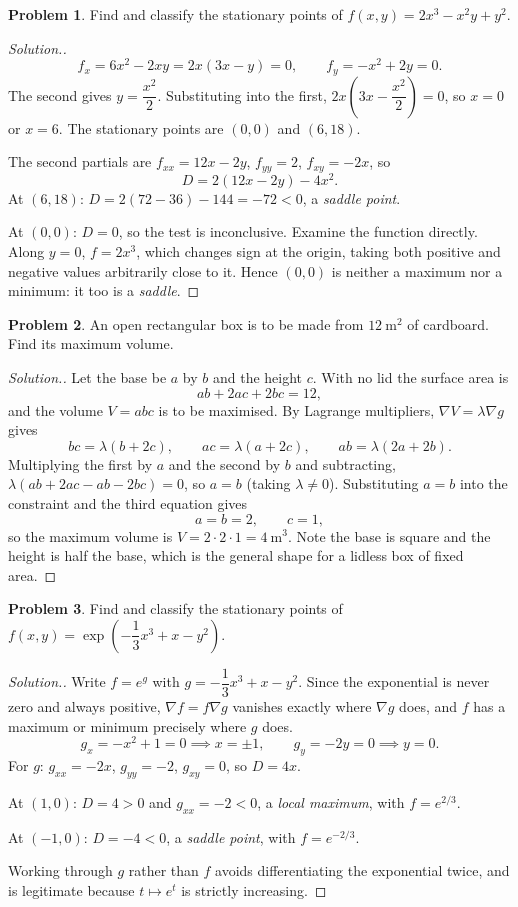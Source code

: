 \documentclass[11pt,a4paper]{article}
\theoremstyle{definition}
\newtheorem{problemx}{Problem}[subsection]
\newenvironment{problem}{\begin{problemx}}{\end{problemx}}
\newenvironment{solution}
  {\renewcommand{\qedsymbol}{}\begin{proof}[\textit{Solution}.]}
  {\end{proof}}
\begin{document}
\begin{problem}
Find and classify the stationary points of $f(x,y) = 2x^3-x^2y+y^2$.
\end{problem}
\begin{solution}
\[f_x = 6x^2-2xy = 2x(3x-y) = 0,\qquad f_y = -x^2+2y = 0 .\]
The second gives $y = \dfrac{x^2}{2}$. Substituting into the first,
$2x\left(3x-\dfrac{x^2}{2}\right) = 0$, so $x = 0$ or $x = 6$. The stationary
points are $(0,0)$ and $(6,18)$.

The second partials are $f_{xx} = 12x-2y$, $f_{yy} = 2$, $f_{xy} = -2x$, so
\[D = 2(12x-2y) - 4x^2 .\]
At $(6,18)$: $D = 2(72-36)-144 = -72 < 0$, a \emph{saddle point}.

At $(0,0)$: $D = 0$, so the test is inconclusive. Examine the function directly.
Along $y=0$, $f = 2x^3$, which changes sign at the origin, taking both positive
and negative values arbitrarily close to it. Hence $(0,0)$ is neither a maximum
nor a minimum: it too is a \emph{saddle}.
\end{solution}

\begin{problem}
An open rectangular box is to be made from $12\ \text{m}^2$ of cardboard. Find
its maximum volume.
\end{problem}
\begin{solution}
Let the base be $a$ by $b$ and the height $c$. With no lid the surface area is
\[ab + 2ac + 2bc = 12 ,\]
and the volume $V = abc$ is to be maximised. By Lagrange multipliers,
$\nabla V = \lambda\nabla g$ gives
\[bc = \lambda(b+2c),\qquad ac = \lambda(a+2c),\qquad ab = \lambda(2a+2b).\]
Multiplying the first by $a$ and the second by $b$ and subtracting,
$\lambda(ab+2ac-ab-2bc) = 0$, so $a = b$ (taking $\lambda\neq 0$).
Substituting $a=b$ into the constraint and the third equation gives
\[a = b = 2,\qquad c = 1 ,\]
so the maximum volume is $V = 2\cdot 2\cdot 1 = 4\ \text{m}^3$. Note the base is
square and the height is half the base, which is the general shape for a lidless
box of fixed area.
\end{solution}

\begin{problem}
Find and classify the stationary points of
$f(x,y) = \exp\left(-\dfrac13x^3 + x - y^2\right)$.
\end{problem}
\begin{solution}
Write $f = e^{g}$ with $g = -\dfrac13x^3+x-y^2$. Since the exponential is never
zero and always positive, $\nabla f = f\nabla g$ vanishes exactly where
$\nabla g$ does, and $f$ has a maximum or minimum precisely where $g$ does.
\[g_x = -x^2+1 = 0 \implies x = \pm 1,\qquad g_y = -2y = 0 \implies y = 0 .\]
For $g$: $g_{xx} = -2x$, $g_{yy} = -2$, $g_{xy} = 0$, so $D = 4x$.

At $(1,0)$: $D = 4>0$ and $g_{xx} = -2<0$, a \emph{local maximum}, with
$f = e^{2/3}$.

At $(-1,0)$: $D = -4<0$, a \emph{saddle point}, with $f = e^{-2/3}$.

Working through $g$ rather than $f$ avoids differentiating the exponential
twice, and is legitimate because $t\mapsto e^t$ is strictly increasing.
\end{solution}
\end{document}
